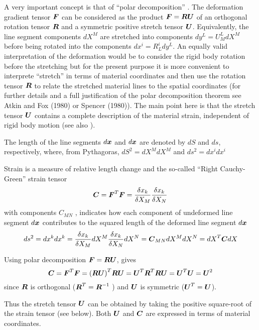 A very important concept is that of ``polar decomposition'' 
. The deformation gradient tensor $\matr{F}$ 
can be considered
as the product $\matr{F}=\matr{R}\matr{U}$ of an orthogonal rotation tensor
$\matr{R}$ and a symmetric positive stretch tensor $\matr{U}$. Equivalently,
the line segment components $dX^{M}$ are stretched into components $dy^{L} =
U^{L}_{M }dX^{M}_{ }$ before being rotated into the components $dx^{i} =
R^{i}_{L} dy^{L}$. An equally valid interpretation of the deformation would be
to consider the rigid body rotation before the stretching but for the present
purpose it is more convenient to interprete ``stretch'' in terms of material
coordinates and then use the rotation tensor $\matr{R}$ to relate the
stretched material lines to the spatial coordinates (for further details and a
full justification of the polar decomposition theorem see Atkin and Fox (1980)
or Spencer (1980)). The main point here is that the stretch tensor $\matr{U}$
contains a complete description of the material strain, independent of rigid
body motion (see also ).
 
The length of the line segments $d\vect{X}$ and $d\vect{x}$ are denoted by $dS$
and $ds$, respectively, where, from Pythagoras, $dS^{2} =dX^{M} dX^{M}$ and
$ds^{2}= dx^{i}dx^{i}$

Strain is a measure of relative length change and the so-called 
``Right Cauchy-Green'' strain tensor
\begin{displaymath}
  \matr{C} = \transpose{\matr{F}}\matr{F} = \frac{\delta x_{k}}{\delta
    X_{M}}\frac{\delta x_{k}}{\delta X_{N}}
\end{displaymath}
with components $C_{MN}$ , indicates how each component of undeformed line
segment $d\vect{X}$ contributes to the squared length of the deformed line
segment $d\vect{x}$ 
\begin{displaymath} 
  ds^{2} = dx^{k} dx^{k} = \dfrac{\delta x_{k}}{\delta X_{M}} dX^{M}
  \dfrac{\delta x_{k}}{\delta X_{N}} dX^{N} = \matr{C}_{MN} dX^{M} 
  dX^{N} = \transpose{dX} \matr{C} dX
\end{displaymath}

Using polar decomposition $\matr{F} = \matr{R}\matr{U}$, gives
\begin{displaymath}
  \matr{C} = \transpose{\matr{F}}\matr{F} =
  \transpose{\pbrac{\matr{R}\matr{U}}} 
  \matr{R}\matr{U} = \transpose{\matr{U}}\transpose{\matr{R}}
  \matr{R}\matr{U} = \transpose{\matr{U}} \matr{U} = \matr{U}^{2}
\end{displaymath}
since $\matr{R}$ is orthogonal ($\transpose{\matr{R}} = \matr{R}^{-1}$ ) and
$\matr{U}$ is symmetric ($\transpose{\matr{U}} = \matr{U}$).

Thus the stretch tensor $\matr{U}$ can be obtained by taking the positive
square-root of the strain tensor (see below).  Both $\matr{U}$ and $\matr{C}$ are
expressed in terms of material coordinates.

